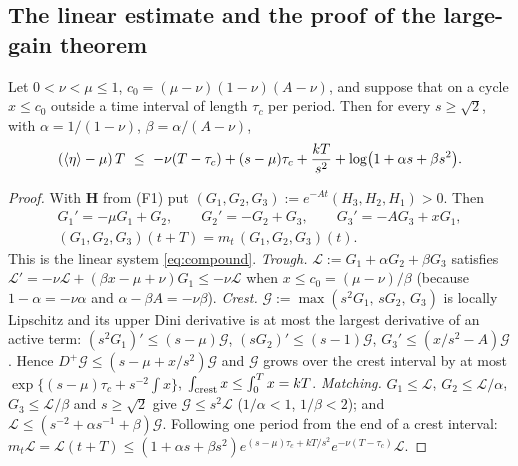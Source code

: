 \subsection{The linear estimate and the proof of the large-gain theorem}\label{lg:sec:linear}
\begin{lemma}\label{lem:lglinear}
Let $0<\nu<\mu\le1$, $c_0=(\mu-\nu)(1-\nu)(A-\nu)$, and suppose that on a cycle $x\le c_0$ outside a time
interval of length $\tau_c$ per period. Then for every $s\ge\sqrt2$, with
$\alpha=1/(1-\nu)$, $\beta=\alpha/(A-\nu)$,
\[
(\avg\eta-\mu)\,T\ \le\ -\nu(T-\tau_c)+(s-\mu)\tau_c+\frac{kT}{s^2}+\log\bigl(1+\alpha s+\beta s^2\bigr).
\]
\end{lemma}
\begin{proof}
With $\mathbf H$ from (F1) put $(G_1,G_2,G_3):=e^{-At}(H_3,H_2,H_1)>0$. Then
\begin{gather*}
G_1'=-\mu G_1+G_2,\qquad G_2'=-G_2+G_3,\qquad G_3'=-AG_3+xG_1,\\
(G_1,G_2,G_3)(t+T)=m_t\,(G_1,G_2,G_3)(t).
\end{gather*}
This is the linear system \eqref{eq:compound}.
\emph{Trough.} $\mathcal L:=G_1+\alpha G_2+\beta G_3$ satisfies
$\mathcal L'=-\nu\mathcal L+(\beta x-\mu+\nu)G_1\le-\nu\mathcal L$ when $x\le c_0=(\mu-\nu)/\beta$
(because $1-\alpha=-\nu\alpha$ and $\alpha-\beta A=-\nu\beta$).
\emph{Crest.} $\mathcal G:=\max(s^2G_1,\,sG_2,\,G_3)$ is locally Lipschitz and its upper Dini derivative is
at most the largest derivative of an active term: $(s^2G_1)'\le(s-\mu)\mathcal G$,
$(sG_2)'\le(s-1)\mathcal G$, $G_3'\le(x/s^2-A)\mathcal G$. Hence
$D^+\mathcal G\le(s-\mu+x/s^2)\mathcal G$ and $\mathcal G$ grows over the crest interval by at most
$\exp\{(s-\mu)\tau_c+s^{-2}\!\int x\}$, $\int_{\rm crest}x\le\int_0^Tx=kT$.
\emph{Matching.} $G_1\le\mathcal L$, $G_2\le\mathcal L/\alpha$, $G_3\le\mathcal L/\beta$ and $s\ge\sqrt2$
give $\mathcal G\le s^2\mathcal L$ ($1/\alpha<1$, $1/\beta<2$); and
$\mathcal L\le(s^{-2}+\alpha s^{-1}+\beta)\mathcal G$. Following one period from the end of a crest
interval: $m_t\mathcal L=\mathcal L(t+T)\le(1+\alpha s+\beta s^2)e^{(s-\mu)\tau_c+kT/s^2}e^{-\nu(T-\tau_c)}\mathcal L$.
\end{proof}

